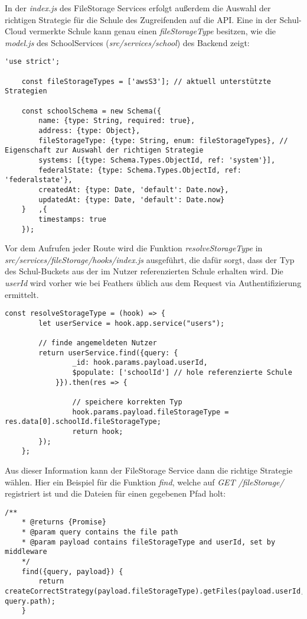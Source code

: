 In der \textit{index.js} des FileStorage Services erfolgt außerdem die Auswahl der richtigen Strategie für die Schule des Zugreifenden auf die API. Eine in der Schul-Cloud vermerkte Schule kann genau einen \textit{fileStorageType} besitzen, wie die \textit{model.js} des SchoolServices (\textit{src/services/school}) des Backend zeigt:

\begin{lstlisting}[label= schoolModel]
	'use strict';

	const fileStorageTypes = ['awsS3']; // aktuell unterstützte Strategien
	
	const schoolSchema = new Schema({
		name: {type: String, required: true},
		address: {type: Object},
		fileStorageType: {type: String, enum: fileStorageTypes}, // Eigenschaft zur Auswahl der richtigen Strategie
		systems: [{type: Schema.Types.ObjectId, ref: 'system'}],
		federalState: {type: Schema.Types.ObjectId, ref: 'federalstate'},
		createdAt: {type: Date, 'default': Date.now},
		updatedAt: {type: Date, 'default': Date.now}
	}	,{
		timestamps: true
	});
\end{lstlisting}

Vor dem Aufrufen jeder Route wird die Funktion \textit{resolveStorageType} in \textit{src/services/fileStorage/hooks/index.js} ausgeführt, die dafür sorgt, dass der Typ des Schul-Buckets aus der im Nutzer referenzierten Schule erhalten wird. Die \textit{userId} wird vorher wie bei Feathers üblich aus dem Request via Authentifizierung ermittelt.

\begin{lstlisting}[label= resolveStorageType]
	const resolveStorageType = (hook) => {
		let userService = hook.app.service("users");
		
		// finde angemeldeten Nutzer
		return userService.find({query: {
				_id: hook.params.payload.userId,
				$populate: ['schoolId'] // hole referenzierte Schule
			}}).then(res => {
			
				// speichere korrekten Typ
				hook.params.payload.fileStorageType = res.data[0].schoolId.fileStorageType;
				return hook;
		});
	};
\end{lstlisting}

Aus dieser Information kann der FileStorage Service dann die richtige Strategie wählen. Hier ein Beispiel für die Funktion \textit{find}, welche auf \textit{GET /fileStorage/} registriert ist und die Dateien für einen gegebenen Pfad holt:

\begin{lstlisting}[label=findFiles]
	/**
	* @returns {Promise}
	* @param query contains the file path
	* @param payload contains fileStorageType and userId, set by middleware
	*/
	find({query, payload}) {
		return createCorrectStrategy(payload.fileStorageType).getFiles(payload.userId, query.path);
	}
\end{lstlisting}


